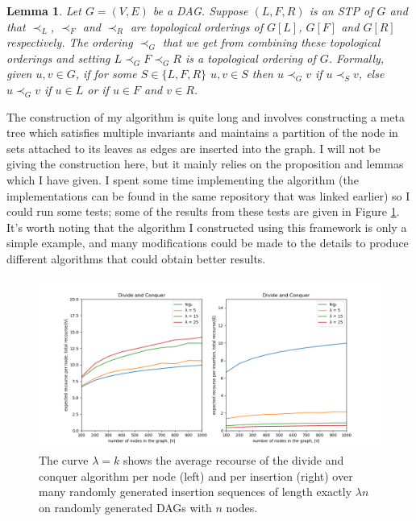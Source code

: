 \documentclass{article}
\newtheorem{lemma}[theorem]{Lemma}
\begin{document}
\begin{lemma}
Let $G=(V,E)$ be a DAG. Suppose $(L,F,R)$ is an STP of $G$ and that $\prec_{L}$, $\prec_{F}$ and $\prec_{R}$ are topological orderings of $G[L]$, $G[F]$ and $G[R]$ respectively. The ordering $\prec_{G}$ that we get from combining these topological orderings and setting $L \prec_{G} F \prec_{G} R$ is a topological ordering of $G$. Formally, given $u, v \in G$, if for some $S \in \{ L,F,R\}$ $u,v \in S$ then $u \prec_{G} v$ if $u \prec_{S} v$, else $u \prec_{G} v$ if $u \in L$ or if $u \in F$ and $v \in R$. 
\end{lemma}

The construction of my algorithm is quite long and involves constructing a meta tree which satisfies multiple invariants and maintains a partition of the node in sets attached to its leaves as edges are inserted into the graph. I will not be giving the construction here, but it mainly relies on the proposition and lemmas which I have given. I spent some time implementing the algorithm (the implementations can be found in the same repository that was linked earlier) so I could run some tests; some of the results from these tests are given in Figure \ref{fig:recoursetests2prog}. It's worth noting that the algorithm I constructed using this framework is only a simple example, and many modifications could be made to the details to produce different algorithms that could obtain better results.

\begin{figure}[htp]
    \centering
    \centerline{\includegraphics[width=18cm]{Images/DnCtests.png}}
    \caption{The curve $\lambda = k$ shows the average recourse of the divide and conquer algorithm per node (left) and per insertion (right) over many randomly generated insertion sequences of length exactly $\lambda n$ on randomly generated DAGs with $n$ nodes.}
    \label{fig:recoursetests2prog}
\end{figure}
\end{document}

